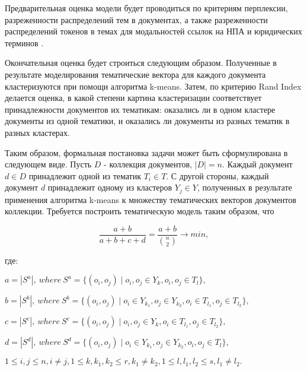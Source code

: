 \documentclass[12pt,twoside]{article}
\begin{document}
Предварительная оценка модели будет проводиться по критериям перплексии, разреженности распределений тем в документах, а также разреженности распределений токенов в темах для модальностей ссылок на НПА и юридических терминов \cite{vorontsov2015additive}. 

Окончательная оценка будет строиться следующим образом. Полученные в результате моделирования тематические вектора для каждого документа кластеризуются при помощи алгоритма k-means. Затем, по критерию Rand Index делается оценка, в какой степени картина кластеризации соответствует принадлежности документов их тематикам:  оказались ли в одном кластере документы из одной тематики, и оказались ли документы из разных тематик в разных кластерах.

Таким образом, формальная постановка задачи может быть сформулирована в следующем виде.
Пусть $D$ - коллекция документов, $|D|=n$. Каждый документ $d\in D$ принадлежит одной из тематик $T_{i}\in T$. С другой стороны, каждый документ $d$ принадлежит одному из кластеров $Y_{j}\in Y$, полученных в результате применения алгоритма k-means к множеству тематических векторов документов коллекции. Требуется построить тематическую модель таким образом, что

\begin{equation}
\frac{a+b}{a+b+c+d} = \frac{a+b}{{n \choose 2 }}\to min,
\end{equation}

где:

$a = |S^{a}|,\ where\ S^{a} = \{ (o_{i}, o_{j}) \mid o_{i}, o_{j} \in Y_{k}, o_{i}, o_{j} \in T_{l}\},$

$b = |S^{b}|,\ where\ S^{b} = \{ (o_{i}, o_{j}) \mid o_{i} \in Y_{k_{1}}, o_{j} \in Y_{k_{2}}, o_{i} \in T_{l_{1}}, o_{j} \in T_{l_{2}}\},$

$c = |S^{c}|,\ where\ S^{c} = \{ (o_{i}, o_{j}) \mid o_{i}, o_{j} \in Y_{k}, o_{i} \in T_{l_{1}}, o_{j} \in T_{l_{2}}\},$

$d = |S^{d}|,\ where\ S^{d} = \{ (o_{i}, o_{j}) \mid o_{i} \in Y_{k_{1}}, o_{j} \in Y_{k_{2}}, o_{i}, o_{j} \in T_{l}\},$

$1 \leq i,j \leq n, i \neq j, 1 \leq k, k_{1}, k_{2} \leq r, k_{1} \neq k_{2}, 1 \leq l, l_{1},l_{2} \leq s, l_{1} \neq l_{2}.$




\end{document}
